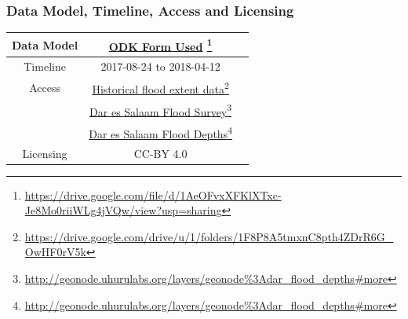 \documentclass[a4paper,12pt,twoside]{article}
\begin{document}
\subsubsection{Data Model, Timeline, Access and Licensing}
\begin{center}
\begin{tabular}{|c|c|c|}  
\hline
Data Model &  \href{https://drive.google.com/file/d/1AeOFvxXFKlXTxc-Je8Mo0riiWLg4jVQw/view?usp=sharing
}{ODK Form Used} \footnote{\url{https://drive.google.com/file/d/1AeOFvxXFKlXTxc-Je8Mo0riiWLg4jVQw/view?usp=sharing}} \\
 \hline
  Timeline  &  2017-08-24 to 2018-04-12 \\
\hline  
 Access  & 
    \href{https://drive.google.com/drive/u/1/folders/1F8P8A5tmxnC8pth4ZDrR6G_OwHF0rV5k}{Historical flood extent data}\footnote{\url{https://drive.google.com/drive/u/1/folders/1F8P8A5tmxnC8pth4ZDrR6G_OwHF0rV5k}}\\
{} & 
    \href{http://geonode.uhurulabs.org/layers/geonode\%3Adar_flood_depths#more}{Dar es Salaam Flood Survey}\footnote{\url{http://geonode.uhurulabs.org/layers/geonode\%3Adar_flood_depths#more}}\\
 {} &    
     \href{http://geonode.uhurulabs.org/layers/geonode\%3Adar_flood_depths#more}{Dar es Salaam Flood Depths}\footnote{\url{http://geonode.uhurulabs.org/layers/geonode\%3Adar_flood_depths#more}} \\
\hline
Licensing   &  CC-BY 4.0 \\
\hline
\end{tabular}
\end{center}
\end{document}
